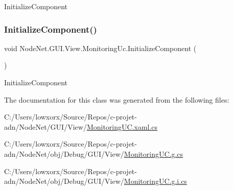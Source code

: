 Initialize\+Component 

\mbox{\label{class_node_net_1_1_g_u_i_1_1_view_1_1_monitoring_uc_a6704bf9d913a2e0c4c413ff02f9a6849}} 
\subsubsection{\texorpdfstring{Initialize\+Component()}{InitializeComponent()}\hspace{0.1cm}{\footnotesize\ttfamily [2/2]}}
{\footnotesize\ttfamily void Node\+Net.\+G\+U\+I.\+View.\+Monitoring\+Uc.\+Initialize\+Component (\begin{DoxyParamCaption}{ }\end{DoxyParamCaption})}



Initialize\+Component 



The documentation for this class was generated from the following files\+:\begin{DoxyCompactItemize}
\item 
C\+:/\+Users/lowxorx/\+Source/\+Repos/c-\/projet-\/adn/\+Node\+Net/\+G\+U\+I/\+View/\hyperlink{_monitoring_u_c_8xaml_8cs}{Monitoring\+U\+C.\+xaml.\+cs}\item 
C\+:/\+Users/lowxorx/\+Source/\+Repos/c-\/projet-\/adn/\+Node\+Net/obj/\+Debug/\+G\+U\+I/\+View/\hyperlink{_monitoring_u_c_8g_8cs}{Monitoring\+U\+C.\+g.\+cs}\item 
C\+:/\+Users/lowxorx/\+Source/\+Repos/c-\/projet-\/adn/\+Node\+Net/obj/\+Debug/\+G\+U\+I/\+View/\hyperlink{_monitoring_u_c_8g_8i_8cs}{Monitoring\+U\+C.\+g.\+i.\+cs}\end{DoxyCompactItemize}
